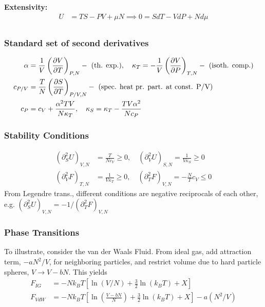 \documentclass[a4paper, english, 12pt]{article}
\newcommand{\closed}[1]{\left( #1 \right)}
\newcommand{\bracket}[1]{\left[ #1 \right]}
\begin{document}
\begin{multicols*}{2}
\textbf{Extensivity:}
\begin{align*}
    U&=TS-PV+\mu N \implies 0 = SdT-VdP+Nd\mu \\ 
\end{align*}



\subsubsection*{\scriptsize Standard set of second derivatives}
\begin{align*}
    \alpha &= \frac{1}{V}\left(\pdv{V}{T} \right)_{P,N} - \text{ (th. exp.)},\quad \kappa_T = -\frac{1}{V}\left(\pdv{V}{P} \right)_{T,N} - \text{ (isoth. comp.)} \\ 
    c_{P/V} &= \frac{T}{N}\left(\pdv{S}{T} \right)_{P/V,N} - \text{ (spec. heat pr. part. at const. P/V)} \\
    c_P &= c_V + \frac{\alpha^2 TV}{N\kappa_T},\quad \kappa_S = \kappa_T - \frac{TV \alpha^2}{Nc_P}
\end{align*}


\subsubsection*{\scriptsize Stability Conditions}

\begin{align*}
    (\partial_S^2 U)_{V,N} &= \frac{T}{N c_V} \geq 0,\quad (\partial_V^2 U)_{S,N} = \frac{1}{V\kappa_S}  \geq0 \\
    (\partial_V^2 F)_{T,N} &= \frac{1}{V \kappa_T} \geq 0,\quad (\partial_T^2 F)_{V,N} = -\frac{N}{T}c_V \leq 0 
\end{align*} 
From Legendre trans., different conditions are negative reciprocals of each other, e.g. $(\partial_S^2 U)_{V,N} = - 1 / (\partial_T^2 F)_{V,N}$



\subsubsection*{\scriptsize Phase Transitions}
To illustrate, consider the van der Waals Fluid. From ideal gas, add attraction term, $-a N^2/V$, for neighboring particles, and restrict volume due to hard particle spheres, $V\to V-bN$. This yields 
\begin{align*}
    F_{IG} &= -N k_B T \bracket{\ln(V/N) + \frac{3}{2}\ln(k_B T)+X} \\ 
    F_{VdW} &= - N k_B T \bracket{\ln\closed{\frac{V-bN}{N}} + \frac{3}{2}\ln(k_B T)+X} - a(N^2/V)
\end{align*}


\end{multicols*}
\end{document}
